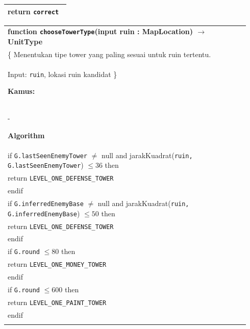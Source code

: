 \documentclass{article}
\newenvironment{pseudobox}
{
\centering
\begin{longtable}{|p{0.94\linewidth}|}
\hline
}
{
\\ \hline
\end{longtable}
\vspace{0.05cm}
}
\begin{document}
\begin{enumerate}[label=\alph*.]
\begin{enumerate}[label=\alph*.]
\begin{pseudobox}
\hspace*{1.5em}return \texttt{correct}
\end{pseudobox}

\begin{pseudobox}
\textbf{function \texttt{chooseTowerType}(input ruin : MapLocation) $\rightarrow$ UnitType} \\
\{ Menentukan tipe tower yang paling sesuai untuk ruin tertentu. \\
Input: \texttt{ruin}, lokasi ruin kandidat
\}

\textbf{Kamus:} \\
\hspace*{1.5em}-

\textbf{Algorithm} \\
\hspace*{1.5em}if \texttt{G.lastSeenEnemyTower} $\neq$ null and jarakKuadrat(\texttt{ruin, G.lastSeenEnemyTower}) $\leq 36$ then \\
\hspace*{3em}return \texttt{LEVEL\_ONE\_DEFENSE\_TOWER} \\
\hspace*{1.5em}endif \\

\hspace*{1.5em}if \texttt{G.inferredEnemyBase} $\neq$ null and jarakKuadrat(\texttt{ruin, G.inferredEnemyBase}) $\leq 50$ then \\
\hspace*{3em}return \texttt{LEVEL\_ONE\_DEFENSE\_TOWER} \\
\hspace*{1.5em}endif \\

\hspace*{1.5em}if \texttt{G.round} $\leq 80$ then \\
\hspace*{3em}return \texttt{LEVEL\_ONE\_MONEY\_TOWER} \\
\hspace*{1.5em}endif \\

\hspace*{1.5em}if \texttt{G.round} $\leq 600$ then \\
\hspace*{3em}return \texttt{LEVEL\_ONE\_PAINT\_TOWER} \\
\hspace*{1.5em}endif \\


\end{pseudobox}
\end{enumerate}
\end{enumerate}
\end{document}
